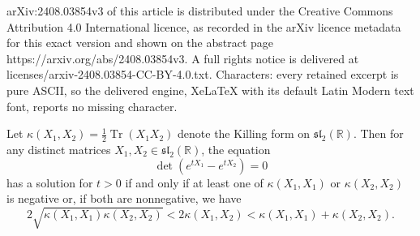\documentclass[10pt,a4paper]{amsart}
\DeclareMathOperator{\Tr}{Tr}
\newcommand{\mattyone}{X_1}
\newcommand{\mattytwo}{X_2}
\newcommand{\simpkill}{\kappa}
\begin{document}
arXiv:2408.03854v3 of this article is distributed under the Creative Commons Attribution 4.0 International licence, as recorded in the arXiv licence metadata for this exact version and shown on the abstract page https://arxiv.org/abs/2408.03854v3. A full rights notice is delivered at licenses/arxiv-2408.03854-CC-BY-4.0.txt. Characters: every retained excerpt is pure ASCII, so the delivered engine, XeLaTeX with its default Latin Modern text font, reports no missing character.
\begin{lemma} 
    Let $\simpkill(\mattyone,\mattytwo)=\tfrac{1}{2}\Tr(\mattyone\mattytwo)$ denote the Killing form on $\mathfrak{sl}_2(\mathbb{R})$. Then for any distinct matrices $\mattyone,\mattytwo\in\mathfrak{sl}_2(\mathbb{R})$, the equation $$\det{(e^{t\mattyone}-e^{t\mattytwo})} = 0$$
    has a solution for $t>0$ if and only if at least one of $\simpkill(\mattyone,\mattyone)$ or $\simpkill(\mattytwo,\mattytwo)$ is negative or, if both are nonnegative, we have
\begin{equation}\label{sl2conditionsecondtime}
2\sqrt{\simpkill(\mattyone,\mattyone)\simpkill(\mattytwo,\mattytwo)} < 2\simpkill(\mattyone,\mattytwo) < \simpkill(\mattyone,\mattyone)+\simpkill(\mattytwo,\mattytwo).
    \end{equation}
\end{lemma}
\end{document}
